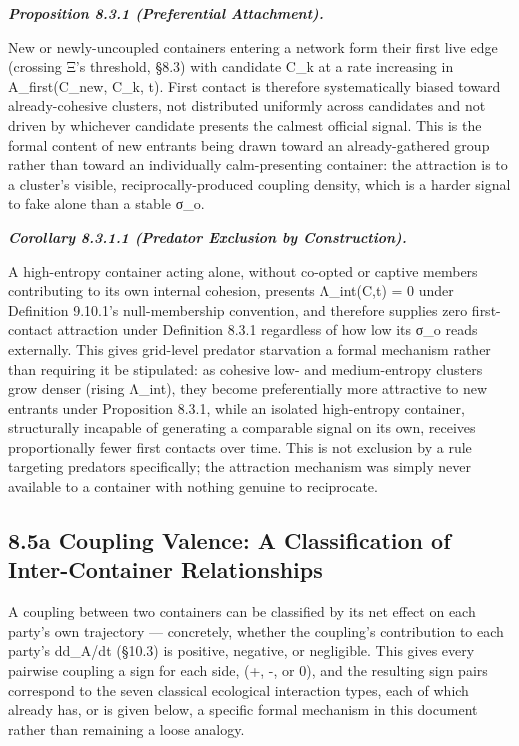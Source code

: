 \documentclass[
]{article}
\begin{document}
\emph{\textbf{Proposition 8.3.1 (Preferential Attachment).}}

New or newly-uncoupled containers entering a network form their first
live edge (crossing Ξ's threshold, §8.3) with candidate C\_k at a rate
increasing in A\_first(C\_new, C\_k, t). First contact is therefore
systematically biased toward already-cohesive clusters, not distributed
uniformly across candidates and not driven by whichever candidate
presents the calmest official signal. This is the formal content of new
entrants being drawn toward an already-gathered group rather than toward
an individually calm-presenting container: the attraction is to a
cluster's visible, reciprocally-produced coupling density, which is a
harder signal to fake alone than a stable σ\_o.

\emph{\textbf{Corollary 8.3.1.1 (Predator Exclusion by Construction).}}

A high-entropy container acting alone, without co-opted or captive
members contributing to its own internal cohesion, presents Λ\_int(C,t)
= 0 under Definition 9.10.1's null-membership convention, and therefore
supplies zero first-contact attraction under Definition 8.3.1 regardless
of how low its σ\_o reads externally. This gives grid-level predator
starvation a formal mechanism rather than requiring it be stipulated: as
cohesive low- and medium-entropy clusters grow denser (rising Λ\_int),
they become preferentially more attractive to new entrants under
Proposition 8.3.1, while an isolated high-entropy container,
structurally incapable of generating a comparable signal on its own,
receives proportionally fewer first contacts over time. This is not
exclusion by a rule targeting predators specifically; the attraction
mechanism was simply never available to a container with nothing genuine
to reciprocate.

\hypertarget{a-coupling-valence-a-classification-of-inter-container-relationships}{%
\subsection{8.5a Coupling Valence: A Classification of Inter-Container
Relationships}\label{a-coupling-valence-a-classification-of-inter-container-relationships}}

A coupling between two containers can be classified by its net effect on
each party's own trajectory --- concretely, whether the coupling's
contribution to each party's dd\_A/dt (§10.3) is positive, negative, or
negligible. This gives every pairwise coupling a sign for each side, (+,
-, or 0), and the resulting sign pairs correspond to the seven classical
ecological interaction types, each of which already has, or is given
below, a specific formal mechanism in this document rather than
remaining a loose analogy.
\end{document}
